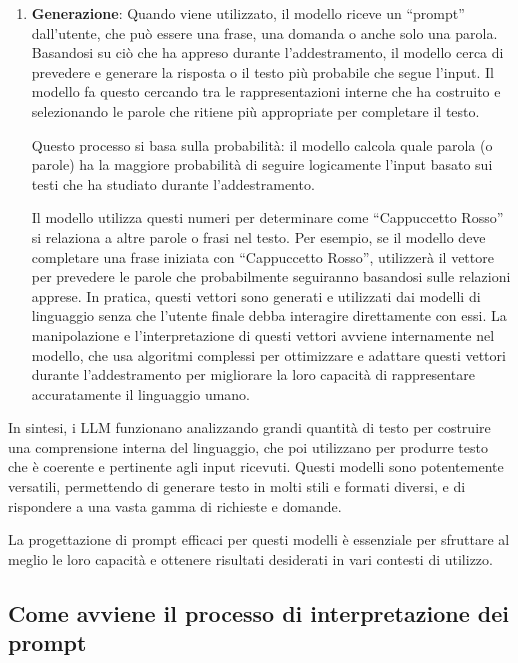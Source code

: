 \begin{enumerate}
                \item
                    \textbf{Generazione}: Quando viene utilizzato, il modello riceve un ``prompt'' dall'utente, che può essere una frase, una domanda o anche solo una parola. Basandosi su ciò che ha appreso durante l'addestramento, il modello cerca di prevedere e generare la risposta o il testo più probabile che segue l'input. Il modello fa questo cercando tra le rappresentazioni interne che ha costruito e selezionando le parole che ritiene più appropriate per completare il testo.
            
                    Questo processo si basa sulla probabilità: il modello calcola quale parola (o parole) ha la maggiore probabilità di seguire logicamente l'input basato sui testi che ha studiato durante l'addestramento.
                    
                    Il modello utilizza questi numeri per determinare come ``Cappuccetto Rosso'' si relaziona a altre parole o frasi nel testo. Per esempio, se il modello deve completare una frase iniziata con ``Cappuccetto Rosso'', utilizzerà il vettore per prevedere le parole che probabilmente seguiranno basandosi sulle relazioni apprese. In pratica, questi vettori sono generati e utilizzati dai modelli di linguaggio senza che l'utente finale debba interagire direttamente con essi. La manipolazione e l'interpretazione di questi vettori avviene internamente nel modello, che usa algoritmi complessi per ottimizzare e adattare questi vettori durante l'addestramento per migliorare la loro capacità di rappresentare accuratamente il linguaggio umano.
            \end{enumerate}
            
            In sintesi, i LLM funzionano analizzando grandi quantità di testo per costruire una comprensione interna del linguaggio, che poi utilizzano per produrre testo che è coerente e pertinente agli input ricevuti. Questi modelli sono potentemente versatili, permettendo di generare testo in molti stili e formati diversi, e di rispondere a una vasta gamma di richieste e domande.
            
            La progettazione di prompt efficaci per questi modelli è essenziale per sfruttare al meglio le loro capacità e ottenere risultati desiderati in vari contesti di utilizzo.
            
    \subsection{Come avviene il processo di interpretazione dei prompt}
        
